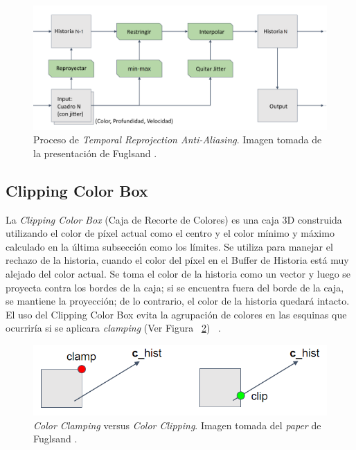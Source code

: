 \documentclass[pregrado]{tesis-usb} %
\begin{document}
\begin{figure}[H]
	\centering
	\includegraphics[scale=0.4]{images/sampling_process.png}
	\caption{Proceso de \textit{Temporal Reprojection Anti-Aliasing}. Imagen tomada de la presentación de Fuglsand \protect\cite{Fuglsand2016}.}\label{fig:samplingprocess}
\end{figure}

\subsection{Clipping Color Box} 
La \textit{Clipping Color Box} (Caja de Recorte de Colores) es una caja 3D construida utilizando el color de píxel actual como el centro y el color mínimo y máximo calculado en la última subsección como los límites. Se utiliza para manejar el rechazo de la historia, cuando el color del píxel en el Buffer de Historia está muy alejado del color actual. Se toma el color de la historia como un vector y luego se proyecta contra los bordes de la caja; si se encuentra fuera del borde de la caja, se mantiene la proyección; de lo contrario, el color de la historia quedará intacto. El uso del Clipping Color Box evita la agrupación de colores en las esquinas que ocurriría si se aplicara \textit{clamping} (Ver Figura ~\ref{fig:clippingbox}) ~\cite{Fuglsand2016}.

\begin{figure}[!hbt]
	\centering
	\includegraphics[scale=0.4]{images/clipping_box.png}
	\caption{\textit{Color Clamping} versus \textit{Color Clipping}. Imagen tomada del \textit{paper} de Fuglsand \protect\cite{Fuglsand2016}.}\label{fig:clippingbox}
\end{figure}
\end{document}
